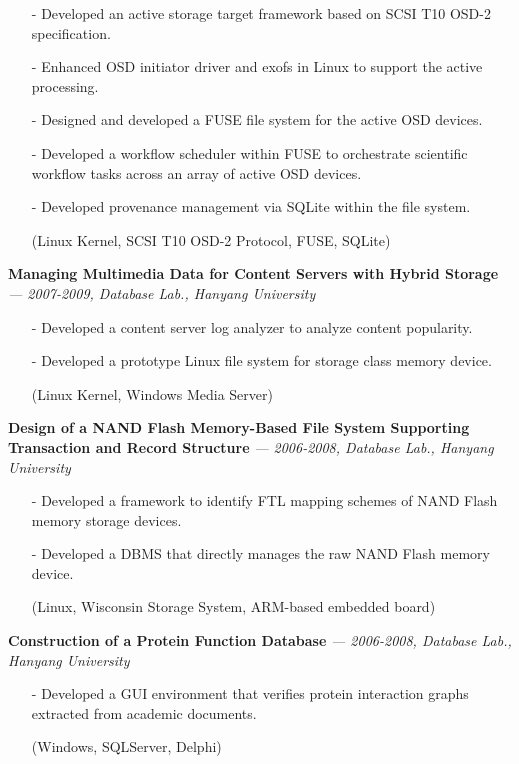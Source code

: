     \begin{itemize}[leftmargin=*]
    \setlength\itemsep{-0.02in}
    \item[-] Developed an active storage target framework based on SCSI T10 OSD-2
    specification.
    \item[-] Enhanced OSD initiator driver and exofs in Linux to support the active
    processing.
    \item[-] Designed and developed a FUSE file system for the active OSD devices.
    \item[-] Developed a workflow scheduler within FUSE to orchestrate scientific
    workflow tasks across an array of active OSD devices.
    \item[-] Developed provenance management via SQLite within the file system.
    \item[] {\small(Linux Kernel, SCSI T10 OSD-2 Protocol, FUSE, SQLite)}
    \end{itemize}
  \vspace{-0.15in}
  {\bf Managing Multimedia Data for Content Servers with Hybrid Storage}
    {\it \footnotesize --- 2007-2009, Database Lab., Hanyang University}
    \begin{itemize}[leftmargin=*]
    \setlength\itemsep{-0.02in}
    \item[-] Developed a content server log analyzer to analyze content popularity.
    \item[-] Developed a prototype Linux file system for storage class memory device.
    \item[] {\small(Linux Kernel, Windows Media Server)}
    \end{itemize}
  \vspace{-0.15in}
  {\bf Design of a NAND Flash Memory-Based File System Supporting Transaction and
      Record Structure} 
    {\it \footnotesize --- 2006-2008, Database Lab., Hanyang University}
    \begin{itemize}[leftmargin=*]
    \setlength\itemsep{-0.02in}
    \item[-] Developed a framework to identify FTL mapping schemes of NAND Flash memory
    storage devices.
    \item[-] Developed a DBMS that directly manages the raw NAND Flash memory device.
    \item[] {\small(Linux, Wisconsin Storage System, ARM-based embedded
     board)}
    \end{itemize}
  \vspace{-0.15in}
  {\bf Construction of a Protein Function Database} 
    {\it \footnotesize --- 2006-2008, Database Lab., Hanyang University}
    \begin{itemize}[leftmargin=*]
    \setlength\itemsep{-0.02in}
    \item[-] Developed a GUI environment that verifies protein interaction graphs extracted
    from academic documents.
    \item[] {\small(Windows, SQLServer, Delphi)}
    \end{itemize}

